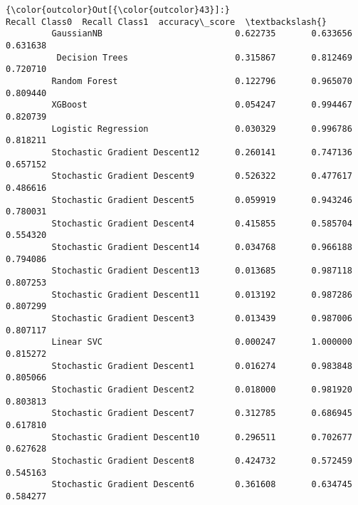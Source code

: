 \documentclass[11pt]{article}
\begin{document}
\begin{Verbatim}[commandchars=\\\{\}]
{\color{outcolor}Out[{\color{outcolor}43}]:}                                Recall Class0  Recall Class1  accuracy\_score  \textbackslash{}
         GaussianNB                          0.622735       0.633656        0.631638   
          Decision Trees                     0.315867       0.812469        0.720710   
         Random Forest                       0.122796       0.965070        0.809440   
         XGBoost                             0.054247       0.994467        0.820739   
         Logistic Regression                 0.030329       0.996786        0.818211   
         Stochastic Gradient Descent12       0.260141       0.747136        0.657152   
         Stochastic Gradient Descent9        0.526322       0.477617        0.486616   
         Stochastic Gradient Descent5        0.059919       0.943246        0.780031   
         Stochastic Gradient Descent4        0.415855       0.585704        0.554320   
         Stochastic Gradient Descent14       0.034768       0.966188        0.794086   
         Stochastic Gradient Descent13       0.013685       0.987118        0.807253   
         Stochastic Gradient Descent11       0.013192       0.987286        0.807299   
         Stochastic Gradient Descent3        0.013439       0.987006        0.807117   
         Linear SVC                          0.000247       1.000000        0.815272   
         Stochastic Gradient Descent1        0.016274       0.983848        0.805066   
         Stochastic Gradient Descent2        0.018000       0.981920        0.803813   
         Stochastic Gradient Descent7        0.312785       0.686945        0.617810   
         Stochastic Gradient Descent10       0.296511       0.702677        0.627628   
         Stochastic Gradient Descent8        0.424732       0.572459        0.545163   
         Stochastic Gradient Descent6        0.361608       0.634745        0.584277   
         

\end{Verbatim}
\end{document}
